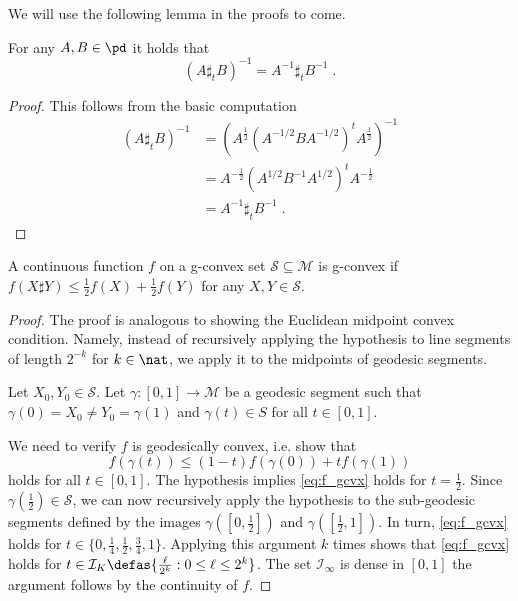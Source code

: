 \documentclass[twoside,11pt]{article}
\begin{document}
We will use the following lemma in the proofs to come. 

\begin{lemma}\label{lemma:inv_commute_sharp}
    For any $A, B \in \pd$ it holds that
    \[
    \left(A \sharp_t B\right)^{-1} = A^{-1} \sharp_t B^{-1} \; .
    \] 
\end{lemma}
\begin{proof}
    This follows from the basic computation
    \begin{align*}
        \left(A \sharp_t B\right)^{-1} &= \left(A^{\frac{1}{2}}\left(A^{-1/2} B A^{-1/2}\right)^t A^{\frac{1}{2}} \right)^{-1} \\
        &= A^{-\frac{1}{2}}\left(A^{1/2} B^{-1} A^{1/2}\right)^t A^{-\frac{1}{2}}\\
        &= A^{-1} \sharp_t B^{-1} \;.
    \end{align*}
\end{proof}

\begin{lemma}
     A continuous function $f$ on a g-convex set $\mathcal{S}\subseteq \mathcal{M}$  is g-convex if $f\left(X \sharp Y \right) \leq \frac{1}{2} f\left(X\right)+\frac{1}{2} f\left(Y\right)$ for any $X,Y  \in \mathcal{S}$.
\end{lemma}
\begin{proof}
    The proof is analogous to showing the Euclidean midpoint convex condition. Namely, instead of recursively applying the hypothesis to line segments of length $2^{-k}$ for $k \in \nat$, we apply it to the midpoints of geodesic segments.

    Let $X_0 ,Y_0 \in \mathcal{S}$. Let $\gamma:[0,1] \to \mathcal{M}$ be a geodesic segment such that $\gamma(0)=X_0 \neq Y_0 = \gamma(1)$ and $\gamma(t) \in S$ for all $t \in [0,1]$. 

    We need to verify $f$ is geodesically convex, i.e. show that 
    \begin{equation}\label{eq:f_gcvx}
    f(\gamma(t)) \leq (1-t)f(\gamma(0)) + t f(\gamma(1))    
    \end{equation}
    holds for all $t \in [0,1]$.
    The hypothesis implies \eqref{eq:f_gcvx} holds for $t = \frac{1}{2}$. Since $\gamma(\frac{1}{2}) \in \mathcal{S}$, we can now recursively apply the hypothesis to the sub-geodesic segments defined by the images $\gamma\left([0,\frac{1}{2}]\right)$ and $\gamma\left([\frac{1}{2}, 1]\right)$. In turn, \eqref{eq:f_gcvx} holds for $t \in \{0, \frac{1}{4}, \frac{1}{2}, \frac{3}{4}, 1\}$. Applying this argument $k$ times shows that \eqref{eq:f_gcvx} holds for $t \in \mathcal{I}_K \defas \{\frac{\ell}{2^k}: 0 \leq \ell \leq 2^k \}$. The set $\mathcal{I}_\infty$ is dense in $[0,1]$ the argument follows by the continuity of $f$. 
\end{proof}
\end{document}

